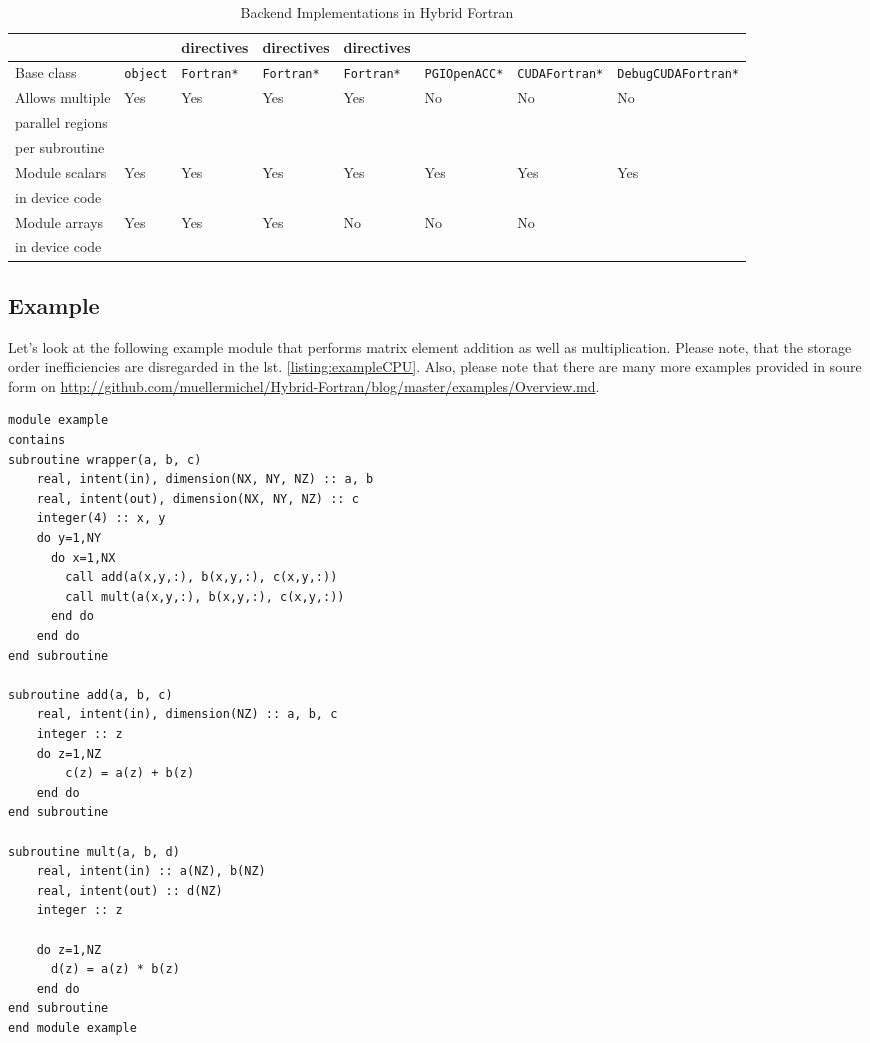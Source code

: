 \begin{table}
\begin{tabular}{lllllll}
                & & directives & directives & directives & & & \\
                \hline
                Base class & \verb|object| & \verb|Fortran*| & \verb|Fortran*| & \verb|Fortran*| & \verb|PGIOpenACC*| & \verb|CUDAFortran*| & \verb|DebugCUDAFortran*| \\
                \hline
                Allows multiple & Yes & Yes & Yes & Yes & No & No & No \\
                parallel regions & & & & & & & \\
                per subroutine & & & & & & & \\
                \hline
                Module scalars & Yes & Yes & Yes & Yes & Yes & Yes & Yes \\
                in device code & & & & & & \\
                \hline
                Module arrays & Yes & Yes & Yes & No & No & No & \\
                in device code & & & & & & & \\
                \hline \hline
        \end{tabular}
        \caption{Backend Implementations in Hybrid Fortran}
        \label{table:backendImplementationComparison}
\end{table}

\subsection{Example} \label{sub:directiveExample}

Let's look at the following example module that performs matrix element addition as well as multiplication. Please note, that the storage order inefficiencies are disregarded in the lst. \ref{listing:exampleCPU}. Also, please note that there are many more examples provided in soure form on \url{http://github.com/muellermichel/Hybrid-Fortran/blog/master/examples/Overview.md}.

\begin{lstlisting}[name=exampleCPU, label=listing:exampleCPU, caption={CPU version of matrix element module}]
module example
contains
subroutine wrapper(a, b, c)
    real, intent(in), dimension(NX, NY, NZ) :: a, b
    real, intent(out), dimension(NX, NY, NZ) :: c
    integer(4) :: x, y
    do y=1,NY
      do x=1,NX
        call add(a(x,y,:), b(x,y,:), c(x,y,:))
        call mult(a(x,y,:), b(x,y,:), c(x,y,:))
      end do
    end do
end subroutine

subroutine add(a, b, c)
    real, intent(in), dimension(NZ) :: a, b, c
    integer :: z
    do z=1,NZ
        c(z) = a(z) + b(z)
    end do
end subroutine

subroutine mult(a, b, d)
    real, intent(in) :: a(NZ), b(NZ)
    real, intent(out) :: d(NZ)
    integer :: z

    do z=1,NZ
      d(z) = a(z) * b(z)
    end do
end subroutine
end module example
\end{lstlisting}

